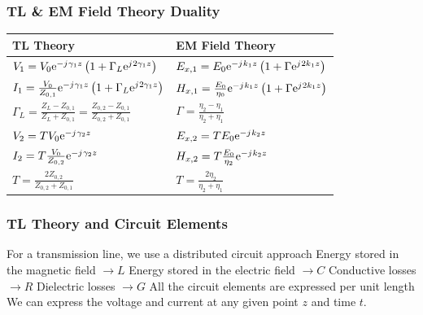 \documentclass[10pt, compress]{beamer}
\newcommand{\e}{\mathrm{e}} %
\renewcommand{\j}{{j}\mkern1mu} %
\begin{document}
\begin{frame}
  \frametitle{TL \& EM Field Theory Duality}
  \begin{table}
    \begin{tabular}{ll}
    \toprule
    TL Theory & EM Field Theory \\
    \midrule
    $V_{1} = V_{0} \e^{-\j \gamma_{1} z} \left(1+\Gamma_{L} \e^{\j 2 \gamma_{1} z}\right)$ & $E_{x,1}=E_{0} \e^{-\j k_{1} z} \left( 1 + \Gamma \e^{\j 2 k_{1} z} \right)$ \\
    $I_{1} = \frac{V_{0}}{Z_{0,1}} \e^{-\j \gamma_{1} z} \left(1+\Gamma_{L} \e^{\j 2 \gamma_{1} z}\right)$ & $H_{x,1} = \frac{E_{0}}{\eta_0} \e^{-\j k_{1} z} \left( 1 + \Gamma \e^{\j 2 k_{1} z} \right)$ \\
   $ \Gamma_{L} = \frac{Z_L - Z_{0,1}}{Z_L + Z_{0,1}} = \frac{Z_{0,2} - Z_{0,1}}{Z_{0,2} + Z_{0,1}}$ & $\Gamma = \frac{\eta_2 - \eta_1}{\eta_2 + \eta_1}$ \\
   $V_2 = T V_0 \e^{-\j \gamma_{2} z}$ & $E_{x,2} = T E_0 \e^{-\j k_{2} z}$ \\
   $I_2 = T \frac{V_0}{Z_{0,2}} \e^{-\j \gamma_{2} z}$ & $H_{x,2} = T \frac{E_0}{\eta_2} \e^{-\j k_{2} z}$ \\
   $T = \frac{2 Z_{0,2}}{{Z_{0,2}} + {Z_{0,1}}}$ & $T = \frac{2 \eta_2}{\eta_2 + \eta_1}$ \\
   \bottomrule
  \end{tabular}
\end{table}
\end{frame}


\begin{frame}
  \frametitle{TL Theory and Circuit Elements}
\begin{outline}
  \1 For a transmission line, we use a distributed circuit approach
  \2 Energy stored in the magnetic field $\rightarrow L$
  \2 Energy stored in the electric field $\rightarrow C$
  \2 Conductive losses $\rightarrow R$
  \2 Dielectric losses $\rightarrow G$
  \1 All the circuit elements are expressed per unit length
  \1 We can express the voltage and current at any given point $z$ and time $t$.
\end{outline}
\end{frame}
\end{document}
